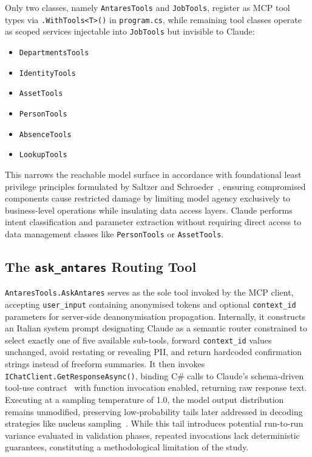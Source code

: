 Only two classes, namely \texttt{AntaresTools} and \texttt{JobTools}, register as MCP tool types via \texttt{.WithTools<T>()} in \texttt{program.cs}, while remaining tool classes operate as scoped services injectable into \texttt{JobTools} but invisible to Claude:
\begin{itemize}
\item \texttt{DepartmentsTools}
\item \texttt{IdentityTools}
\item \texttt{AssetTools}
\item \texttt{PersonTools}
\item \texttt{AbsenceTools}
\item \texttt{LookupTools}
\end{itemize}
This narrows the reachable model surface in accordance with foundational least privilege principles formulated by Saltzer and Schroeder~\cite{saltzer1975protection}, ensuring compromised components cause restricted damage by limiting model agency exclusively to business-level operations while insulating data access layers. Claude performs intent classification and parameter extraction without requiring direct access to data management classes like \texttt{PersonTools} or \texttt{AssetTools}.

\subsection{The \texttt{ask\_antares} Routing Tool}
\label{subsec:impl_ask_antares}

\texttt{AntaresTools.AskAntares} serves as the sole tool invoked by the MCP client, accepting \texttt{user\_input} containing anonymised tokens and optional \texttt{context\_id} parameters for server-side deanonymisation propagation. Internally, it constructs an Italian system prompt designating Claude as a semantic router constrained to select exactly one of five available sub-tools, forward \texttt{context\_id} values unchanged, avoid restating or revealing PII, and return hardcoded confirmation strings instead of freeform summaries. It then invokes \texttt{IChatClient.GetResponseAsync()}, binding C\# calls to Claude's schema-driven tool-use contract~\cite{anthropic2024tooluse} with function invocation enabled, returning raw response text. Executing at a sampling temperature of 1.0, the model output distribution remains unmodified, preserving low-probability tails later addressed in decoding strategies like nucleus sampling~\cite{holtzman2020degeneration}. While this tail introduces potential run-to-run variance evaluated in validation phases, repeated invocations lack deterministic guarantees, constituting a methodological limitation of the study.


